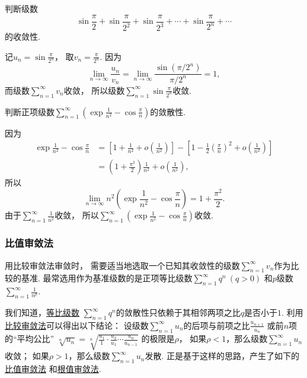 \begin{example}
\newcommand\sinfrac[1][]{\sin\frac{\pi}{2^{#1}}}
判断级数\[
	\sinfrac + \sinfrac[2] + \sinfrac[3] + \dotsb + \sinfrac[n] + \dotsb
\]的收敛性.
\begin{solution}
记\(u_n = \sin\frac{\pi}{2^n}\)，
取\(v_n = \frac{\pi}{2^n}\).
因为\[
	\lim_{n\to\infty} \frac{u_n}{v_n}
	= \lim_{n\to\infty} \frac{\sin(\pi/2^n)}{\pi/2^n}
	= 1,
\]
而级数\(\sum_{n=1}^\infty v_n\)收敛，
所以级数\(\sum_{n=1}^\infty \sin\frac{\pi}{2^n}\)收敛.
\end{solution}
\end{example}

\begin{example}
判断正项级数\(\sum_{n=1}^\infty \left(\exp\frac1{n^2}-\cos\frac\pi{n}\right)\)的敛散性.
\begin{solution}
因为\begin{align*}
	\exp\frac1{n^2}-\cos\frac\pi{n}
	&= \left[1+\frac1{n^2}+o\left(\frac1{n^2}\right)\right]
	- \left[1-\frac12\left(\frac\pi{n}\right)^2+o\left(\frac1{n^2}\right)\right] \\
	&= \left(1+\frac{\pi^2}2\right) \frac1{n^2} + o\left(\frac1{n^2}\right),
\end{align*}
所以\[
	\lim_{n\to\infty} n^2 \left(\exp\frac1{n^2}-\cos\frac\pi{n}\right)
	= 1+\frac{\pi^2}2.
\]
由于\(\sum_{n=1}^\infty \frac1{n^2}\)收敛，
所以\(\sum_{n=1}^\infty \left(\exp\frac1{n^2}-\cos\frac\pi{n}\right)\)收敛.
\end{solution}
\end{example}

\subsubsection{比值审敛法}
用比较审敛法审敛时，
需要适当地选取一个已知其收敛性的级数\(\sum_{n=1}^\infty v_n\)作为比较的基准.
最常选用作为基准级数的是正项等比级数\(\sum_{n=1}^\infty q^n\ (q>0)\)
和\(p\)级数\(\sum_{n=1}^\infty \frac1{n^p}\).

我们知道，\hyperref[example:无穷级数.等比级数的收敛性]{等比级数}
\(\sum_{n=1}^\infty q^n\)的敛散性只依赖于其相邻两项之比\(q\)是否小于\(1\).
利用\hyperref[theorem:无穷级数.正项级数的比较审敛法]{比较审敛法}可以得出以下结论：
设级数\(\sum_{n=1}^\infty u_n\)的后项与前项之比\(\frac{u_{n+1}}{u_n}\)
或前\(n\)项的“平均公比”
\(\sqrt[n]{u_n}
= \sqrt[n]{\frac{u_1}1\cdot\frac{u_2}{u_1}\dotsm\frac{u_n}{u_{n-1}}}\)
的极限是\(\rho\)，
如果\(\rho<1\)，那么级数\(\sum_{n=1}^\infty u_n\)收敛；
如果\(\rho>1\)，那么级数\(\sum_{n=1}^\infty u_n\)发散.
正是基于这样的思路，产生了如下的\hyperref[theorem:无穷级数.正项级数的比值审敛法]{比值审敛法}%
和\hyperref[theorem:无穷级数.正项级数的根值审敛法]{根值审敛法}.

